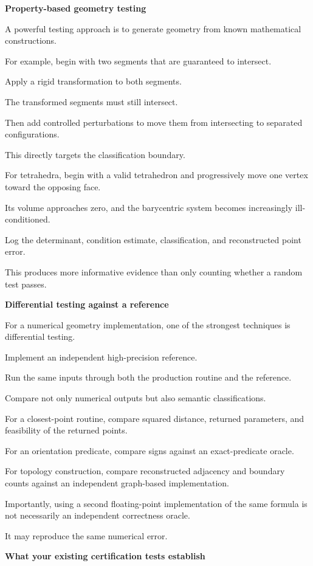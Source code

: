 \textbf{Property-based geometry testing}

A powerful testing approach is to generate geometry from known mathematical constructions.

For example, begin with two segments that are guaranteed to intersect.

Apply a rigid transformation to both segments.

The transformed segments must still intersect.

Then add controlled perturbations to move them from intersecting to separated configurations.

This directly targets the classification boundary.

For tetrahedra, begin with a valid tetrahedron and progressively move one vertex toward the opposing face.

Its volume approaches zero, and the barycentric system becomes increasingly ill-conditioned.

Log the determinant, condition estimate, classification, and reconstructed point error.

This produces more informative evidence than only counting whether a random test passes.

\textbf{Differential testing against a reference}

For a numerical geometry implementation, one of the strongest techniques is differential testing.

Implement an independent high-precision reference.

Run the same inputs through both the production routine and the reference.

Compare not only numerical outputs but also semantic classifications.

For a closest-point routine, compare squared distance, returned parameters, and feasibility of the returned points.

For an orientation predicate, compare signs against an exact-predicate oracle.

For topology construction, compare reconstructed adjacency and boundary counts against an independent graph-based implementation.

Importantly, using a second floating-point implementation of the same formula is not necessarily an independent correctness oracle.

It may reproduce the same numerical error.

\textbf{What your existing certification tests establish}

